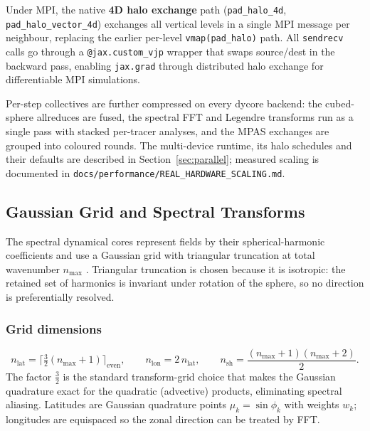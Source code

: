 \documentclass[11pt,a4paper]{article}
\begin{document}
Under MPI, the native \textbf{4D halo exchange} path (\texttt{pad\_halo\_4d}, \texttt{pad\_halo\_vector\_4d}) exchanges all vertical levels in a single MPI message per neighbour, replacing the earlier per-level \texttt{vmap(pad\_halo)} path.  All \texttt{sendrecv} calls go through a \texttt{@jax.custom\_vjp} wrapper that swaps source/dest in the backward pass, enabling \texttt{jax.grad} through distributed halo exchange for differentiable MPI simulations.

Per-step collectives are further compressed on every dycore backend: the cubed-sphere allreduces are fused, the spectral FFT and Legendre transforms run as a single pass with stacked per-tracer analyses, and the MPAS exchanges are grouped into coloured rounds.  The multi-device runtime, its halo schedules and their defaults are described in Section~\ref{sec:parallel}; measured scaling is documented in \texttt{docs/performance/REAL\_HARDWARE\_SCALING.md}.

\subsection{Gaussian Grid and Spectral Transforms}

The spectral dynamical cores represent fields by their spherical-harmonic coefficients and use a Gaussian grid with triangular truncation at total wavenumber $n_{\max}$ \citep{Bourke1972}.  Triangular truncation is chosen because it is isotropic: the retained set of harmonics is invariant under rotation of the sphere, so no direction is preferentially resolved.

\subsubsection{Grid dimensions}
\begin{equation}
  n_{\mathrm{lat}} = \lceil\tfrac{3}{2}(n_{\max}+1)\rceil_{\mathrm{even}},
  \qquad n_{\mathrm{lon}} = 2\,n_{\mathrm{lat}},
  \qquad n_{\mathrm{sh}} = \frac{(n_{\max}+1)(n_{\max}+2)}{2}.
\end{equation}
The factor $\tfrac{3}{2}$ is the standard transform-grid choice that makes the Gaussian quadrature exact for the quadratic (advective) products, eliminating spectral aliasing.  Latitudes are Gaussian quadrature points $\mu_k=\sin\phi_k$ with weights $w_k$; longitudes are equispaced so the zonal direction can be treated by FFT.
\end{document}
